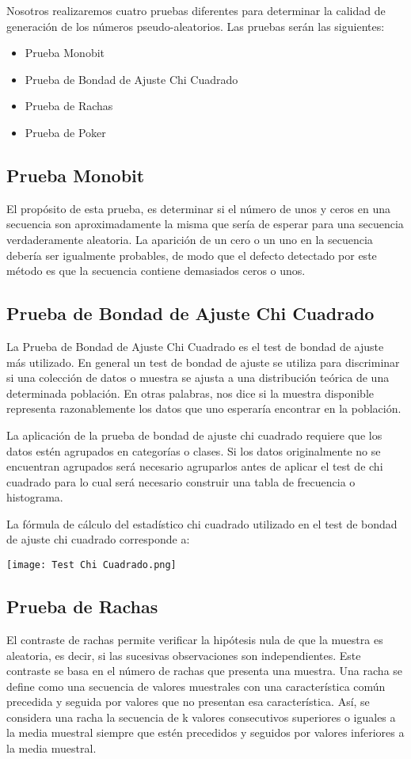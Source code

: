 \documentclass{article}
\begin{document}
Nosotros realizaremos cuatro pruebas diferentes para determinar la calidad de generación de los números pseudo-aleatorios. Las pruebas serán las siguientes:
\begin{itemize}
\item Prueba Monobit
\item Prueba de Bondad de Ajuste Chi Cuadrado
\item Prueba de Rachas
\item Prueba de Poker
\end{itemize}
\subsection{Prueba Monobit}
El propósito de esta prueba, es determinar si el número de unos y ceros en una secuencia son aproximadamente la misma que sería de esperar para una secuencia verdaderamente aleatoria. La aparición de un cero o un uno en la secuencia debería ser igualmente probables, de modo que el defecto detectado por este método es que la secuencia contiene demasiados ceros o unos.

\subsection{Prueba de Bondad de Ajuste Chi Cuadrado}
La Prueba de Bondad de Ajuste Chi Cuadrado es el test de bondad de ajuste más utilizado. En general un test de bondad de ajuste se utiliza para discriminar si una colección de datos o muestra se ajusta a una distribución teórica de una determinada población. En otras palabras, nos dice si la muestra disponible representa razonablemente los datos que uno esperaría encontrar en la población.

La aplicación de la prueba de bondad de ajuste chi cuadrado requiere que los datos estén agrupados en categorías o clases. Si los datos originalmente no se encuentran agrupados será necesario agruparlos antes de aplicar el test de chi cuadrado para lo cual será necesario construir una tabla de frecuencia o histograma.

La fórmula de cálculo del estadístico chi cuadrado utilizado en el test de bondad de ajuste chi cuadrado corresponde a:
\begin{center}
    \texttt{[image: Test Chi Cuadrado.png]}
\end{center}

\subsection{Prueba de Rachas}
El contraste de rachas permite verificar la hipótesis nula de que la muestra es aleatoria, es decir, si las sucesivas observaciones son independientes. Este contraste se basa en el número de rachas que presenta una muestra. Una racha se define como una secuencia de valores muestrales con una característica común precedida y seguida por valores que no presentan esa característica. Así, se considera una racha la secuencia de k valores consecutivos superiores o iguales a la media muestral siempre que estén precedidos y seguidos por valores inferiores a la media muestral.
\end{document}
